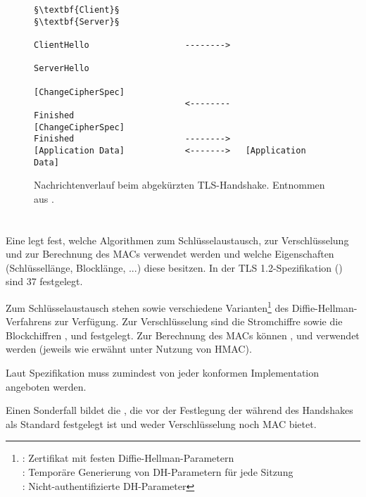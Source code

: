 \lstset{
	style=default,
	frame=single
}
\begin{figure}[H]
	\centering
	\begin{lstlisting}
§\textbf{Client}§                                                §\textbf{Server}§

ClientHello                   -------->
                                                 ServerHello
                                          [ChangeCipherSpec]
                              <--------             Finished
[ChangeCipherSpec]
Finished                      -------->
[Application Data]            <------->   [Application Data]
	\end{lstlisting}
	\caption{Nachrichtenverlauf beim abgekürzten TLS-Handshake. Entnommen aus \cite{tls12}.}
	\label{fig_abbreviated_handshake}
\end{figure}
\lstset{style=tls}


\section{\ciphersuites{}}
\label{sec_cipher_suites}

Eine \ciphersuite{} legt fest, welche Algorithmen zum Schlüsselaustausch, zur Verschlüsselung und zur Berechnung des MACs verwendet werden und welche Eigenschaften (Schlüssellänge, Blocklänge, ...) diese besitzen. In der TLS 1.2-Spezifikation (\cite{tls12}) sind 37 \ciphersuites{} festgelegt.

Zum Schlüsselaustausch stehen  sowie verschiedene Varianten\footnote{
	: Zertifikat mit festen Diffie-Hellman-Parametern\\ 
	: Temporäre Generierung von DH-Parametern für jede Sitzung \\
	:  Nicht-authentifizierte DH-Parameter
} des Diffie-Hellman-Verfahrens zur Verfügung. 
Zur Verschlüsselung sind die Stromchiffre  sowie die Blockchiffren ,  und  festgelegt. 
Zur Berechnung des MACs können ,  und  verwendet werden (jeweils wie erwähnt unter Nutzung von HMAC).

Laut Spezifikation muss zumindest  von jeder konformen Implementation angeboten werden.

Einen Sonderfall bildet die \ciphersuite{} , die vor der Festlegung der \ciphersuite{} während des Handshakes als Standard festgelegt ist und weder Verschlüsselung noch MAC bietet.

